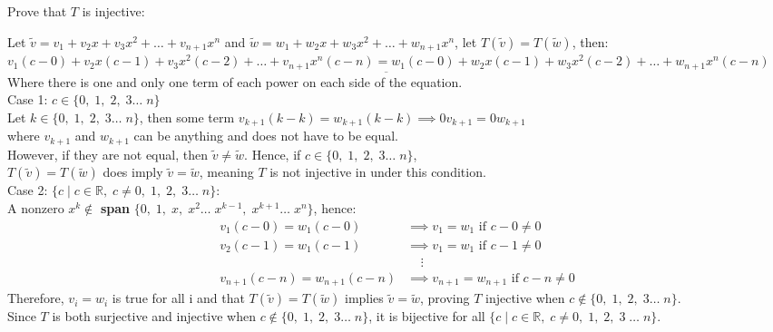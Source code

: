 \documentclass[10pt]{article}
\begin{document}
{{\begin{center}
    \end{center}
    \begin{spacing}{1.5}
    Prove that $T$ is injective:\\
    \vspace*{-24pt}
    \begin{center}
    Let $\tilde{v}=v_1+v_2x+v_3x^2+\dots+v_{n+1}x^n$ and $\tilde{w}=w_1+w_2x+w_3x^2+\dots+w_{n+1}x^n$, let $T(\tilde{v})=T(\tilde{w})$, then:\\
    \vspace{10pt}
    $\underbar{v_1(c-0)+v_2x(c-1)+v_3x^2(c-2)+\dots+v_{n+1}x^n(c-n)=w_1(c-0)+w_2x(c-1)+w_3x^2(c-2)+\dots+w_{n+1}x^n(c-n)}$\\
    Where there is one and only one term of each power on each side of the equation.\\
    \vspace{10pt}
    Case 1: $c\in\{0,\;1,\;2,\;3\dots\;n\}$\\
    Let $k\in\{0,\;1,\;2,\;3\dots\;n\}$, then some term $v_{k+1}(k-k)=w_{k+1}(k-k)\implies 0v_{k+1}=0w_{k+1}$\\
    where $v_{k+1}$ and $w_{k+1}$ can be anything and does not have to be equal.\\
    However, if they are not equal, then $\tilde v\neq\tilde w$. Hence, if $c\in\{0,\;1,\;2,\;3\dots\;n\}$,\\
    $T(\tilde{v})=T(\tilde{w})$ does  imply $\tilde{v}=\tilde{w}$, meaning $T$ is not injective in under this condition.\\
    \vspace{10pt}
    Case 2: $\{c\;|\;c\in\mathbb{R},\;c\neq 0,\;1,\;2,\;3\dots \;n\}$:\\
    A nonzero $x^k \notin$ \textbf{span} $\{0,\;1,\;x,\;x^2\dots\;x^{k-1},\;x^{k+1}\dots\;x^n\}$, hence:\\
    \vspace{-30pt}
    \begin{align*}
        v_1(c-0)=w_1(c-0)&\implies v_1=w_1 \text{ if } c-0\neq0\\
        v_2(c-1)=w_1(c-1)&\implies v_1=w_1 \text{ if } c-1\neq0\\
        &\;\;\;\;\vdots\\
        v_{n+1}(c-n)=w_{n+1}(c-n)&\implies v_{n+1}=w_{n+1} \text{ if } c-n\neq0
    \end{align*}
    Therefore, $v_i=w_i$ is true for all i and that $T(\tilde{v})=T(\tilde{w})$ implies $\tilde{v}=\tilde{w}$, proving $T$ injective when $c\notin\{0,\;1,\;2,\;3\dots\;n\}$.\\
    \vspace{10pt}
    Since $T$ is both surjective and injective when $c\notin\{0,\;1,\;2,\;3\dots\;n\}$, it is bijective for all $\{c\;|\;c\in\mathbb{R},\;c\neq 0,\;1,\;2,\;3\;\dots \;n\}.$ 
    \end{center}
    \end{spacing}
    
	}
}
\end{document}
